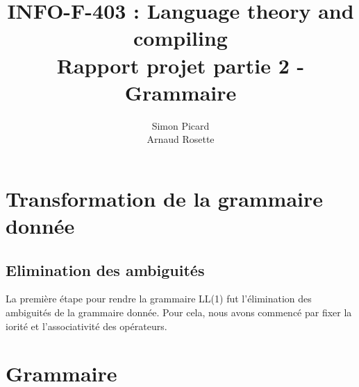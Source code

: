 \documentclass[a4paper,10pt]{article}
\title{INFO-F-403 : Language theory and compiling \\ Rapport projet partie 2 - Grammaire}
\author{Simon Picard \\ Arnaud Rosette}
\begin{document}
\maketitle

\section{Transformation de la grammaire donnée}
\subsection{Elimination des ambiguités}
La première étape pour rendre la grammaire LL(1) fut l'élimination des ambiguités de la grammaire donnée. Pour cela, nous avons commencé par fixer la iorité et l'associativité des opérateurs. 


\section{Grammaire}
\end{document}
